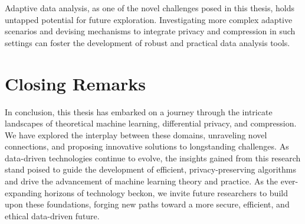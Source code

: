 Adaptive data analysis, as one of the novel challenges posed in this thesis, holds untapped potential for future exploration. Investigating more complex adaptive scenarios and devising mechanisms to integrate privacy and compression in such settings can foster the development of robust and practical data analysis tools.

\section{Closing Remarks}
\label{sec:conclusion:closing}

In conclusion, this thesis has embarked on a journey through the intricate landscapes of theoretical machine learning, differential privacy, and compression. We have explored the interplay between these domains, unraveling novel connections, and proposing innovative solutions to longstanding challenges. As data-driven technologies continue to evolve, the insights gained from this research stand poised to guide the development of efficient, privacy-preserving algorithms and drive the advancement of machine learning theory and practice. As the ever-expanding horizons of technology beckon, we invite future researchers to build upon these foundations, forging new paths toward a more secure, efficient, and ethical data-driven future.


